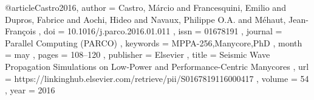 @article{Castro2016,
	author    = { Castro, M{\'{a}}rcio and
		          Francesquini, Emilio and
			      Dupros, Fabrice and
				  Aochi, Hideo and
				  Navaux, Philippe O.A. and
				  M{\'{e}}haut, Jean-Fran{\c{c}}ois
	},
	doi       = { 10.1016/j.parco.2016.01.011 },
	issn      = { 01678191 },
	journal   = { Parallel Computing (PARCO) },
	keywords  = { MPPA-256,Manycore,PhD },
	month     = { may },
	pages     = { 108--120 },
	publisher = { Elsevier },
	title     = { Seismic Wave Propagation Simulations on Low-Power and Performance-Centric Manycores },
	url       = { https://linkinghub.elsevier.com/retrieve/pii/S0167819116000417 },
	volume    = { 54 },
	year      = { 2016 }
}
